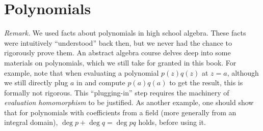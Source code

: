 \documentclass[11pt]{article}
\begin{document}
\newpage
\section{Polynomials}
\textit{Remark.} We used facts about polynomials in high school algebra. These facts were intuitively ``understood'' back then, but we never had the chance to rigorously prove them. An abstract algebra course delves deep into some materials on polynomials, which we still take for granted in this book. For example, note that when evaluating a polynomial $p(z)q(z)$ at $z = a$, although we still directly plug $a$ in and compute $p(a)q(a)$ to get the result, this is formally not rigorous. This ``plugging-in'' step requires the machinery of \emph{evaluation homomorphism} to be justified. As another example, one should show that for polynomials with coefficients from a field (more generally from an integral domain), $\deg p + \deg q = \deg pq$ holds, before using it.
\end{document}
